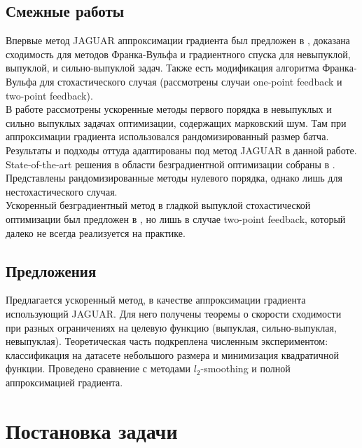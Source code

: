 \documentclass{article}
\begin{document}
\subsection{Смежные работы}
Впервые метод JAGUAR аппроксимации градиента был предложен в \cite{bogdanov2024aspects}, доказана сходимость для методов Франка-Вульфа и градиентного спуска для невыпуклой, выпуклой, и сильно-выпуклой задач. Также есть модификация алгоритма Франка-Вульфа для стохастического случая (рассмотрены случаи one-point feedback и two-point feedback).\\
В работе \cite{beznosikov2023order} рассмотрены ускоренные методы первого порядка в невыпуклых и сильно выпуклых задачах оптимизации, содержащих марковский шум. Там при аппроксимации градиента использовался рандомизированный размер батча. Результаты и подходы оттуда адаптированы под метод JAGUAR в данной работе.\\
State-of-the-art решения в области безградиентной оптимизации собраны в \cite{gasnikov2024randomized}. Представлены рандомизированные методы нулевого порядка, однако лишь для нестохастического случая.\\
Ускоренный безградиентный метод в гладкой выпуклой стохастической оптимизации был предложен в \cite{gorbunov2020accelerated}, но лишь в случае two-point feedback, который далеко не всегда реализуется на практике.
\subsection{Предложения}
Предлагается ускоренный метод, в качестве аппроксимации градиента использующий JAGUAR. Для него получены теоремы о скорости сходимости при разных ограничениях на целевую функцию (выпуклая, сильно-выпуклая, невыпуклая). Теоретическая часть подкреплена численным экспериментом: классификация на датасете небольшого размера и минимизация квадратичной функции. Проведено сравнение с методами $l_2$-smoothing и полной аппроксимацией градиента.

\section{Постановка задачи}


\end{document}
